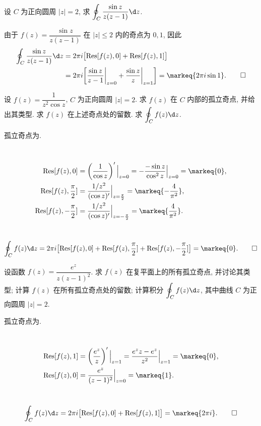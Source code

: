 \begin{exercise}
	设 $C$ 为正向圆周 $|z|=2$, 求 $\displaystyle\oint_C\frac{\sin z}{z(z-1)}\d z$.
\end{exercise}
\begin{solution}
	由于 $f(z)=\dfrac{\sin z}{z(z-1)}$ 在 $|z|\le 2$ 内的奇点为 $0,1$, 因此
	\begin{align*}
		\oint_C\frac{\sin z}{z(z-1)}\d z&=2\pi i\bigl[\Res[f(z),0]+\Res[f(z),1]\bigr] \\
		&=2\pi i\biggl[\frac{\sin z}{z-1}\bigg|_{z=0}+\frac{\sin z}{z}\bigg|_{z=1}\biggr]=\markeq{2\pi i\sin1}. \qedhere
	\end{align*}
\end{solution}


\begin{exercise}
	设 $f(z)=\dfrac1{z^2\cos z}$, $C$ 为正向圆周 $|z|=2$.
	\subex 求 $f(z)$ 在 $C$ 内部的孤立奇点, 并给出其类型.
	\subex 求 $f(z)$ 在上述奇点处的留数.
	\subex 求 $\displaystyle\oint_C f(z)\d z$.
\end{exercise}
\begin{solution}
	\subex 孤立奇点为.

	\subex~
	\begin{align*}
		\Res[f(z),0]&=\left(\frac1{\cos z}\right)'\Big|_{z=0}
		=-\frac{-\sin z}{\cos^2 z}\Big|_{z=0}=\markeq{0},\\
		\Res[f(z),\frac\pi2]&=\frac{1/z^2}{(\cos z)'}\Big|_{z=\frac\pi2}=\markeq{-\frac4{\pi^2}},\\
		\Res[f(z),-\frac\pi2]&=\frac{1/z^2}{(\cos z)'}\Big|_{z=-\frac\pi2}=\markeq{\frac4{\pi^2}}.
	\end{align*}

	\subex~
	\[\oint_Cf(z)\d z=2\pi i\bigl[\Res[f(z),0]+\Res[f(z),\frac\pi2]+\Res[f(z),-\frac\pi2]\bigr]=\markeq{0}.\qedhere\]
\end{solution}


\begin{exercise}
	设函数 $f(z)=\dfrac{e^z}{z(z-1)^2}$.
	\subex 求 $f(z)$ 在复平面上的所有孤立奇点, 并讨论其类型;
	\subex 计算 $f(z)$ 在所有孤立奇点处的留数;
	\subex 计算积分 $\displaystyle\oint_Cf(z)\d z$, 其中曲线 $C$ 为正向圆周 $|z|=2$.
\end{exercise}
\begin{solution}
	\subex 孤立奇点为.

	\subex~
	\begin{align*}
		\Res[f(z),1]&=\left(\frac{e^z}{z}\right)'\Big|_{z=1}
		=\frac{e^z z-e^z}{z^2}\Big|_{z=1}=\markeq{0},\\
		\Res[f(z),0]&=\frac{e^z}{(z-1)^2}\Big|_{z=0}=\markeq{1}.
	\end{align*}

	\subex~
	\[\oint_Cf(z)\d z=2\pi i\bigl[\Res[f(z),0]+\Res[f(z),1]\bigr]=\markeq{2\pi i}.\qedhere\]
\end{solution}


